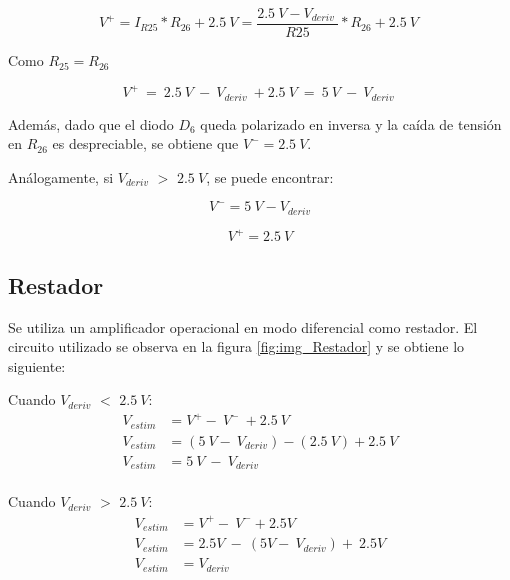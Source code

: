 \begin{equation} \label{eq_V+}
	V^+=I_{R25}*R_{26}+2.5\:V=\frac{2.5\:V-V_{deriv}\ }{R25}*R_{26}+2.5\:V\ 
\end{equation} 

Como $R_{25}=R_{26}$

\begin{equation} \label{eq_V+_2}
	V^+\ =\ 2.5\:V\ -\ V_{deriv}\ +2.5\:V\ =\ 5\:V\ -\ V_{deriv}\ 
\end{equation}

Además, dado que el diodo $D_6$ queda polarizado en inversa y la caída de tensión en $R_{26}$ es despreciable, se obtiene que $V^- = 2.5\:V$.

An\'{a}logamente, si $V_{deriv}$ $\mathrm{>}$ $2.5\:V$, se puede encontrar:

\begin{equation} \label{eq_V+_3}
	V^- =5\:V-V_{deriv} 
\end{equation}

\begin{equation} 
	V^+ = 2.5\:V
\end{equation}


\subsection{Restador}

\noindent Se utiliza un amplificador operacional en modo diferencial como restador. El circuito utilizado se observa en la figura \ref{fig:img_Restador} y se obtiene lo siguiente:

\noindent Cuando $V_{deriv}$ $\mathrm{<}$ $2.5\:V$:
\begin{equation*} 
	\begin{aligned}
		V_{estim}&=V^+-\ V^-\ +2.5\:V\\ 
		V_{estim}&=(5\:V -\ V_{deriv})-(2.5\: V)+2.5\:V\\
		V_{estim}&=5\: V\ -\ V_{deriv}\\ 
	\end{aligned}
\end{equation*}


\noindent Cuando $V_{deriv}$ $\mathrm{>}$ $2.5\:V$: 
\begin{equation*} 
	\begin{aligned}
		V_{estim}&=V^+-\ V^-+2.5V\\ 
		V_{estim}&=2.5V\ -\ (5V-\ V_{deriv})+\ 2.5V\\
		V_{estim}&=V_{deriv}\\
	\end{aligned}
\end{equation*}

